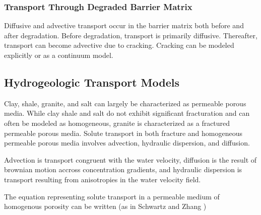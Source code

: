 \subsubsection{Transport Through Degraded Barrier Matrix}

Diffusive and advective transport occur in the barrier matrix both before and 
after degradation. Before degradation, transport is primarily diffusive. 
Thereafter, transport can become advective due to cracking. Cracking can be 
modeled explicitly or as a continuum model.  


\subsection{Hydrogeologic Transport Models}

Clay, shale, granite, and salt can largely be characterized as permeable porous 
media. While clay shale and salt do not exhibit significant fracturation and can 
often be modeled as homogeneous, granite is  characterized as a fractured 
permeable porous media.  Solute transport in both fracture and homogeneous 
permeable porous media involves advection, hydraulic dispersion, and diffusion. 

Advection is transport congruent with the water velocity, diffusion is the 
result of brownian motion accross concentration gradients, and hydraulic 
dispersion is transport resulting from anisotropies in the water velocity field. 








The equation representing solute transport in a permeable medium of homogenous
porosity can be written (as in Schwartz and Zhang 
\cite{schwartz_fundamentals_2004})

